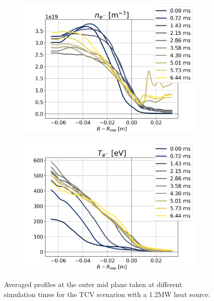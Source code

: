 \begin{figure}[H]\centering
	\begin{subfigure}[t]{0.45\textwidth}
		\centering
		\includegraphics[width=1\textwidth]{schemes/OMP_profiles_e-_n_Hmode.png}
		\label{fig:TCV_highPower_OMPn}
	\end{subfigure}
	\begin{subfigure}[t]{0.45\textwidth}
		\centering
		\includegraphics[width=1\textwidth]{schemes/OMP_profiles_e-_T_Hmode.png}
		\label{fig:TCV_highPower_OMPT}
	\end{subfigure}
	\caption[Averaged profiles at the outer mid plane taken at different simulation times for the TCV scenarion with a 1.2MW heat source]{Averaged profiles at the outer mid plane taken at different simulation times for the TCV scenarion with a 1.2MW heat source.}
	\label{fig:TCV_highPower_OMP}
\end{figure}

